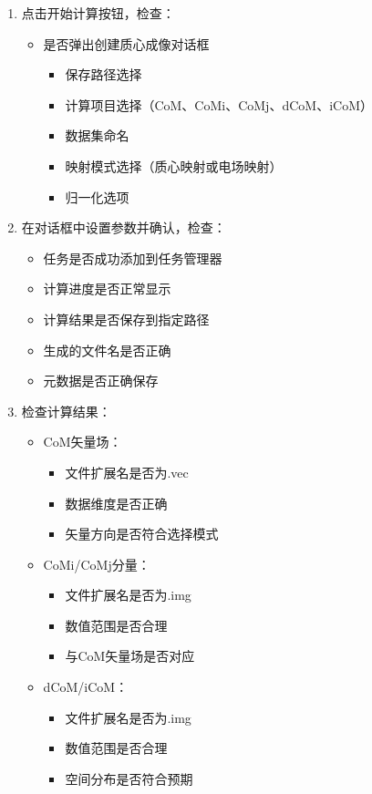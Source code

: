 \documentclass[a4paper,12pt]{report}	%
\begin{document}
\begin{enumerate}
    \item 点击开始计算按钮，检查：
    \begin{itemize}
        \item 是否弹出创建质心成像对话框
        \begin{itemize}
            \item 保存路径选择
            \item 计算项目选择（CoM、CoMi、CoMj、dCoM、iCoM）
            \item 数据集命名
            \item 映射模式选择（质心映射或电场映射）
            \item 归一化选项
        \end{itemize}
    \end{itemize}

    \item 在对话框中设置参数并确认，检查：
    \begin{itemize}
        \item 任务是否成功添加到任务管理器
        \item 计算进度是否正常显示
        \item 计算结果是否保存到指定路径
        \item 生成的文件名是否正确
        \item 元数据是否正确保存
    \end{itemize}

    \item 检查计算结果：
    \begin{itemize}
        \item CoM矢量场：
        \begin{itemize}
            \item 文件扩展名是否为.vec
            \item 数据维度是否正确
            \item 矢量方向是否符合选择模式
        \end{itemize}
        \item CoMi/CoMj分量：
        \begin{itemize}
            \item 文件扩展名是否为.img
            \item 数值范围是否合理
            \item 与CoM矢量场是否对应
        \end{itemize}
        \item dCoM/iCoM：
        \begin{itemize}
            \item 文件扩展名是否为.img
            \item 数值范围是否合理
            \item 空间分布是否符合预期
        \end{itemize}
    \end{itemize}
\end{enumerate}
\end{document}
